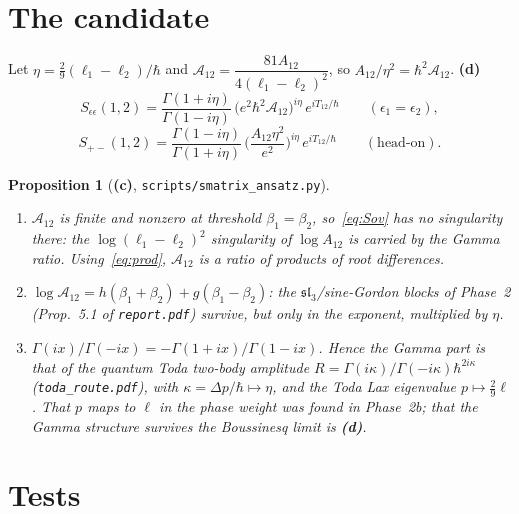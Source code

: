 \documentclass[11pt,a4paper]{article}
\newcommand{\Lc}{\textsf{\textbf{(c)}}}
\newcommand{\Ld}{\textsf{\textbf{(d)}}}
\newcommand{\script}[1]{\texttt{scripts/#1}}
\newtheorem{proposition}{Proposition}[section]
\theoremstyle{remark}\newtheorem{remark}[proposition]{Remark}
\newcommand{\cA}{\mathcal A}
\begin{document}
\section{The candidate}\label{sec:cand}
Let $\eta=\tfrac29(\ell_1-\ell_2)/\hbar$ and $\cA_{12}=\dfrac{81A_{12}}{4(\ell_1-\ell_2)^2}$, so $A_{12}/\eta^2=\hbar^2\cA_{12}$. \Ld
\begin{equation}\label{eq:Sov}
S_{\epsilon\epsilon}(1,2)=\frac{\Gamma(1+i\eta)}{\Gamma(1-i\eta)}\,\big(e^2\hbar^2\cA_{12}\big)^{i\eta}\,e^{iT_{12}/\hbar}\qquad(\epsilon_1=\epsilon_2),
\end{equation}
\begin{equation}\label{eq:Sho}
S_{+-}(1,2)=\frac{\Gamma(1-i\eta)}{\Gamma(1+i\eta)}\,\Big(\frac{A_{12}\eta^2}{e^2}\Big)^{i\eta}\,e^{iT_{12}/\hbar}\qquad(\text{head-on}).
\end{equation}

\begin{proposition}[\Lc, \script{smatrix\_ansatz.py}]\label{prop:struct}
\begin{enumerate}
\item $\cA_{12}$ is finite and nonzero at threshold $\beta_1=\beta_2$, so~\eqref{eq:Sov} has no singularity there: the $\log(\ell_1-\ell_2)^2$ singularity of $\log A_{12}$ is carried by the Gamma ratio. Using~\eqref{eq:prod}, $\cA_{12}$ is a ratio of products of root differences.
\item $\log\cA_{12}=h(\beta_1+\beta_2)+g(\beta_1-\beta_2)$: the $\mathfrak{sl}_3$/sine-Gordon blocks of Phase~2 (Prop.~5.1 of \texttt{report.pdf}) survive, but only \emph{in the exponent}, multiplied by $\eta$.
\item $\Gamma(ix)/\Gamma(-ix)=-\Gamma(1+ix)/\Gamma(1-ix)$. Hence the Gamma part is that of the quantum Toda two-body amplitude $R=\Gamma(i\kappa)/\Gamma(-i\kappa)\hbar^{2i\kappa}$ (\texttt{toda\_route.pdf}), with $\kappa=\Delta p/\hbar\mapsto\eta$, and the Toda Lax eigenvalue $p\mapsto\tfrac29\ell$. That $p$ maps to $\ell$ in the phase weight was found in Phase~2b; that the Gamma structure survives the Boussinesq limit is \Ld.
\end{enumerate}
\end{proposition}

\section{Tests}
\end{document}
